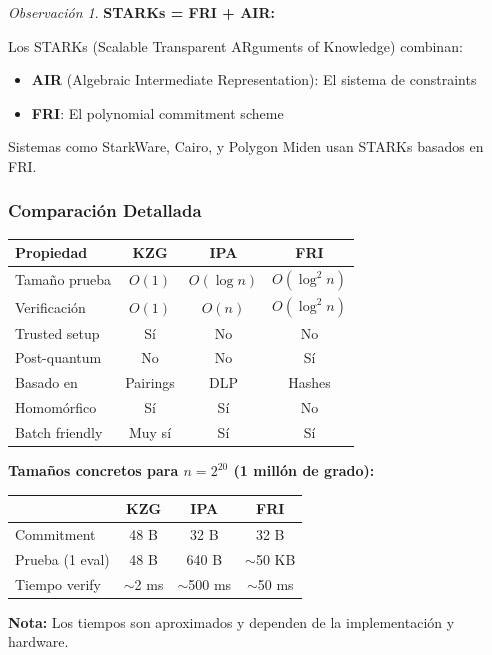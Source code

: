 \documentclass[11pt,a4paper,twoside,openright]{book}
\theoremstyle{definition}
\theoremstyle{plain}
\theoremstyle{remark}
\newtheorem{remark}{Observación}[chapter]
\begin{document}
\begin{remark}
\textbf{STARKs = FRI + AIR:}

Los STARKs (Scalable Transparent ARguments of Knowledge) combinan:
\begin{itemize}
    \item \textbf{AIR} (Algebraic Intermediate Representation): El sistema de constraints
    \item \textbf{FRI}: El polynomial commitment scheme
\end{itemize}

Sistemas como StarkWare, Cairo, y Polygon Miden usan STARKs basados en FRI.
\end{remark}

\subsubsection{Comparación Detallada}

\begin{center}
\begin{tabular}{lccc}
\toprule
\textbf{Propiedad} & \textbf{KZG} & \textbf{IPA} & \textbf{FRI} \\
\midrule
Tamaño prueba & $O(1)$ & $O(\log n)$ & $O(\log^2 n)$ \\
Verificación & $O(1)$ & $O(n)$ & $O(\log^2 n)$ \\
Trusted setup & Sí & No & No \\
Post-quantum & No & No & Sí \\
Basado en & Pairings & DLP & Hashes \\
Homomórfico & Sí & Sí & No \\
Batch friendly & Muy sí & Sí & Sí \\
\bottomrule
\end{tabular}
\end{center}

\begin{mathnote}
\textbf{Tamaños concretos para $n = 2^{20}$ (1 millón de grado):}

\begin{center}
\begin{tabular}{lccc}
\toprule
& \textbf{KZG} & \textbf{IPA} & \textbf{FRI} \\
\midrule
Commitment & 48 B & 32 B & 32 B \\
Prueba (1 eval) & 48 B & 640 B & $\sim$50 KB \\
Tiempo verify & $\sim$2 ms & $\sim$500 ms & $\sim$50 ms \\
\bottomrule
\end{tabular}
\end{center}

\textbf{Nota:} Los tiempos son aproximados y dependen de la implementación y hardware.
\end{mathnote}
\end{document}
